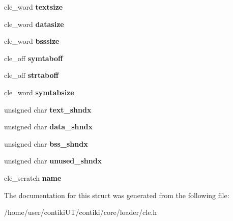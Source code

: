 \begin{DoxyCompactItemize}
\item 
\hypertarget{structcle__info_a9287b4a044c9f9e8b2a01ed296624067}{}cle\+\_\+word {\bfseries textsize}\label{structcle__info_a9287b4a044c9f9e8b2a01ed296624067}

\item 
\hypertarget{structcle__info_ae251b93df3b371f00a17402b9eec459b}{}cle\+\_\+word {\bfseries datasize}\label{structcle__info_ae251b93df3b371f00a17402b9eec459b}

\item 
\hypertarget{structcle__info_a05616780a5c3525100fc1524f2b4fc63}{}cle\+\_\+word {\bfseries bsssize}\label{structcle__info_a05616780a5c3525100fc1524f2b4fc63}

\item 
\hypertarget{structcle__info_a7d1d0f743f87766c781ed6baef7a07cb}{}cle\+\_\+off {\bfseries symtaboff}\label{structcle__info_a7d1d0f743f87766c781ed6baef7a07cb}

\item 
\hypertarget{structcle__info_a83639e2938de0fc673d95e187e2d5344}{}cle\+\_\+off {\bfseries strtaboff}\label{structcle__info_a83639e2938de0fc673d95e187e2d5344}

\item 
\hypertarget{structcle__info_acbb6cebc6b250e5fbe583260c639e5f3}{}cle\+\_\+word {\bfseries symtabsize}\label{structcle__info_acbb6cebc6b250e5fbe583260c639e5f3}

\item 
\hypertarget{structcle__info_ad485ef19a7ad2368048735739a0feb39}{}unsigned char {\bfseries text\+\_\+shndx}\label{structcle__info_ad485ef19a7ad2368048735739a0feb39}

\item 
\hypertarget{structcle__info_ac8beaf9c1ed47b979cd26646c30927b9}{}unsigned char {\bfseries data\+\_\+shndx}\label{structcle__info_ac8beaf9c1ed47b979cd26646c30927b9}

\item 
\hypertarget{structcle__info_ad099fc41db22793cdfa3897e81494c9b}{}unsigned char {\bfseries bss\+\_\+shndx}\label{structcle__info_ad099fc41db22793cdfa3897e81494c9b}

\item 
\hypertarget{structcle__info_a4f2a5fe771fb7d40b1ec122d157f4f8c}{}unsigned char {\bfseries unused\+\_\+shndx}\label{structcle__info_a4f2a5fe771fb7d40b1ec122d157f4f8c}

\item 
\hypertarget{structcle__info_a42066a7735b27bb1e4710844a8ac8132}{}cle\+\_\+scratch {\bfseries name}\label{structcle__info_a42066a7735b27bb1e4710844a8ac8132}

\end{DoxyCompactItemize}


The documentation for this struct was generated from the following file\+:\begin{DoxyCompactItemize}
\item 
/home/user/contiki\+U\+T/contiki/core/loader/cle.\+h\end{DoxyCompactItemize}
